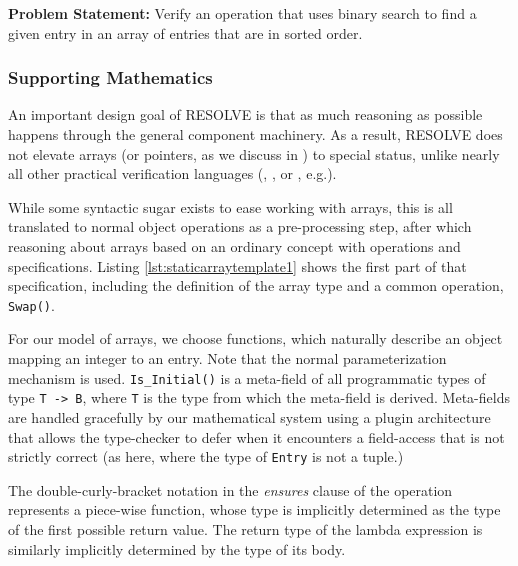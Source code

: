 \textbf{Problem Statement:} Verify an operation that uses binary search to find a given entry in an array of entries that are in sorted order.

		\subsubsection{Supporting Mathematics}	%

An important design goal of RESOLVE is that as much reasoning as possible happens through the general component machinery.  As a result, RESOLVE does not elevate arrays (or pointers, as we discuss in \cite{kulczyckiPointers}) to special status, unlike nearly all other practical verification languages (\cite{DafnyOverview}, \cite{cok:esc}, or \cite{kuncakJahobOverview}, e.g.).

While some syntactic sugar exists to ease working with arrays, this is all translated to normal object operations as a pre-processing step, after which reasoning about arrays based on an ordinary concept with operations and specifications.  Listing \ref{lst:staticarraytemplate1} shows the first part of that specification, including the definition of the array type and a common operation, \texttt{Swap()}.



For our model of arrays, we choose functions, which naturally describe an object mapping an integer to an entry.  Note that the normal parameterization mechanism is used.  \texttt{Is\_Initial()} is a meta-field of all programmatic types of type \texttt{T -> B}, where \texttt{T} is the type from which the meta-field is derived.  Meta-fields are handled gracefully by our mathematical system using a plugin architecture that allows the type-checker to defer when it encounters a field-access that is not strictly correct (as here, where the type of \texttt{Entry} is not a tuple.)

The double-curly-bracket notation in the \emph{ensures} clause of the operation represents a piece-wise function, whose type is implicitly determined as the type of the first possible return value.  The return type of the lambda expression is similarly implicitly determined by the type of its body.

